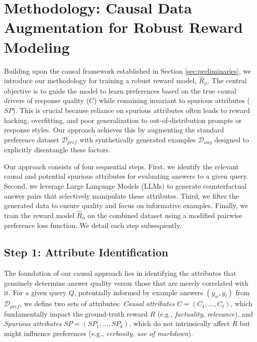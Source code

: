 \section{Methodology: Causal Data Augmentation for Robust Reward Modeling}
\label{sec:methodology}

Building upon the causal framework established in Section \ref{sec:preliminaries}, we introduce our methodology for training a robust reward model, $\hat{R}_\phi$. The central objective is to guide the model to learn preferences based on the true causal drivers of response quality ($C$) while remaining invariant to spurious attributes ($SP$). This is crucial because reliance on spurious attributes often leads to reward hacking, overfitting, and poor generalization to out-of-distribution prompts or response styles. Our approach achieves this by augmenting the standard preference dataset $\mathcal{D}_{pref}$ with synthetically generated examples $\mathcal{D}_{aug}$ designed to explicitly disentangle these factors.


Our approach consists of four sequential steps. First, we identify the relevant causal and potential spurious attributes for evaluating answers to a given query. Second, we leverage Large Language Models (LLMs) to generate counterfactual answer pairs that selectively manipulate these attributes. Third, we filter the generated data to ensure quality and focus on informative examples. Finally, we train the reward model $\hat{R}_\phi$ on the combined dataset using a modified pairwise preference loss function. We detail each step subsequently.

\subsection{Step 1: Attribute Identification}
\label{subsec:attribute_identification}

The foundation of our causal approach lies in identifying the attributes that genuinely determine answer quality versus those that are merely correlated with it. For a given query $Q$, potentially informed by example answers $(y_w, y_l)$ from $\mathcal{D}_{pref}$, we define two sets of attributes: \emph{Causal attributes} $C = (C_1, \dots, C_\ell)$, which fundamentally impact the ground-truth reward $R$ (e.g., \textit{factuality}, \textit{relevance}), and \emph{Spurious attributes} $SP = (SP_1, \dots, SP_k)$, which do not intrinsically affect $R$ but might influence preferences (e.g., \textit{verbosity}, \textit{use of markdown}).


